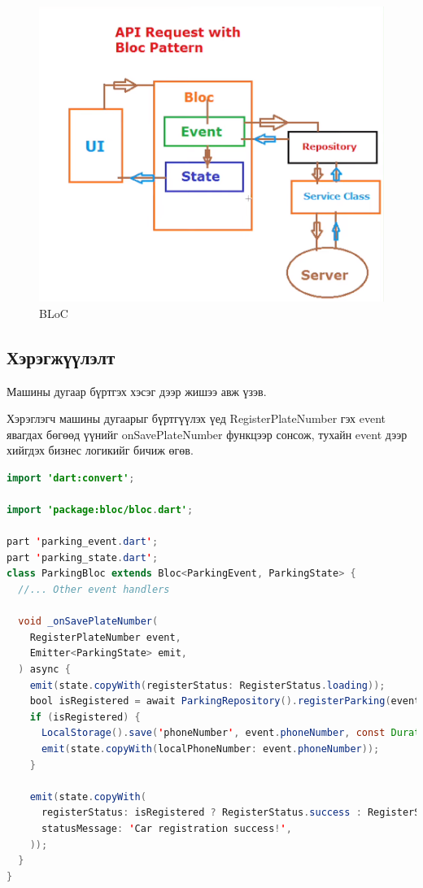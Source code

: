 \begin{figure}
  \centering
  \includegraphics[scale=0.5]{imgs/bloc.png}
  \caption{BLoC }
\end{figure}

\subsection{Хэрэгжүүлэлт}

Машины дугаар бүртгэх хэсэг дээр жишээ авж үзэв.  

Хэрэглэгч машины дугаарыг бүртгүүлэх үед RegisterPlateNumber гэх event явагдах бөгөөд үүнийг onSavePlateNumber функцээр сонсож, тухайн event дээр хийгдэх бизнес логикийг бичиж өгөв. 

\begin{lstlisting}[language=Java, frame=single, caption=BLoC компонентийн машины дугаар бүртгэлийн хэрэгжүүлэлт]
import 'dart:convert';

import 'package:bloc/bloc.dart';

part 'parking_event.dart';
part 'parking_state.dart';
class ParkingBloc extends Bloc<ParkingEvent, ParkingState> {
  //... Other event handlers

  void _onSavePlateNumber(
    RegisterPlateNumber event,
    Emitter<ParkingState> emit,
  ) async {
    emit(state.copyWith(registerStatus: RegisterStatus.loading));
    bool isRegistered = await ParkingRepository().registerParking(event.phoneNumber, event.plateNumber);
    if (isRegistered) {
      LocalStorage().save('phoneNumber', event.phoneNumber, const Duration(days: 365));
      emit(state.copyWith(localPhoneNumber: event.phoneNumber));
    }

    emit(state.copyWith(
      registerStatus: isRegistered ? RegisterStatus.success : RegisterStatus.failure,
      statusMessage: 'Car registration success!',
    ));
  }
}
\end{lstlisting}

